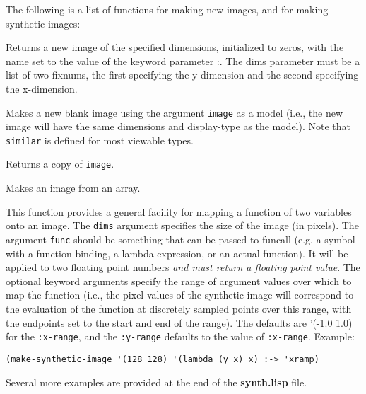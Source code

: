 The following is a list of functions for making new images, and for
making synthetic images:
\begin{description}
\item{}
Returns a new image of the specified dimensions, initialized to
zeros, with the name set to the value of the keyword parameter :\res.
The dims parameter must be a list of two fixnums, the first specifying
the y-dimension and the second specifying the x-dimension.  

\item{}
Makes a new blank image using the argument {\tt image} as a model
(i.e., the new image will have the same dimensions and display-type as
the model).  Note that {\tt similar} is defined for most viewable
types.

\item{}
Returns a copy of {\tt image}.

\item{}
Makes an image from an array.  

\item{}
This function provides a general facility for mapping a function of
two variables onto an image.  The {\tt dims} argument specifies the
size of the image (in pixels).  The argument {\tt func} should be
something that can be passed to funcall (e.g. a symbol with a function
binding, a lambda expression, or an actual function).  It will be
applied to two floating point numbers {\em and must return a floating
point value}.  The optional keyword arguments specify the range of
argument values over which to map the function (i.e., the pixel values
of the synthetic image will correspond to the evaluation of the
function at discretely sampled points over this range, with the
endpoints set to the start and end of the range).  The defaults
are '(-1.0 1.0) for the {\tt :x-range}, and the {\tt :y-range}
defaults to the value of {\tt :x-range}.  Example:
\begin{verbatim}
(make-synthetic-image '(128 128) '(lambda (y x) x) :-> 'xramp)
\end{verbatim}
Several more examples are provided at the end of the {\bf synth.lisp} file.

\item{}


\end{description}
